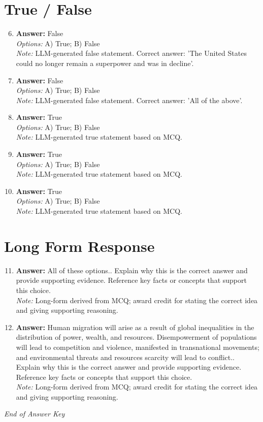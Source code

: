 \documentclass[12pt]{article}
\begin{document}
\section*{True / False}
\begin{enumerate}[label=\arabic*.]
\setcounter{enumi}{5}
\item \textbf{Answer:} False
\\ \textit{Options:} A) True; B) False
\\ \textit{Note:} LLM-generated false statement. Correct answer: 'The United States could no longer remain a superpower and was in decline'.
\item \textbf{Answer:} False
\\ \textit{Options:} A) True; B) False
\\ \textit{Note:} LLM-generated false statement. Correct answer: 'All of the above'.
\item \textbf{Answer:} True
\\ \textit{Options:} A) True; B) False
\\ \textit{Note:} LLM-generated true statement based on MCQ.
\item \textbf{Answer:} True
\\ \textit{Options:} A) True; B) False
\\ \textit{Note:} LLM-generated true statement based on MCQ.
\item \textbf{Answer:} True
\\ \textit{Options:} A) True; B) False
\\ \textit{Note:} LLM-generated true statement based on MCQ.
\end{enumerate}

\section*{Long Form Response}
\begin{enumerate}[label=\arabic*.]
\setcounter{enumi}{10}
\item \textbf{Answer:} All of these options.. Explain why this is the correct answer and provide supporting evidence. Reference key facts or concepts that support this choice.
\\ \textit{Note:} Long-form derived from MCQ; award credit for stating the correct idea and giving supporting reasoning.
\item \textbf{Answer:} Human migration will arise as a result of global inequalities in the distribution of power, wealth, and resources. Disempowerment of populations will lead to competition and violence, manifested in transnational movements; and environmental threats and resources scarcity will lead to conflict.. Explain why this is the correct answer and provide supporting evidence. Reference key facts or concepts that support this choice.
\\ \textit{Note:} Long-form derived from MCQ; award credit for stating the correct idea and giving supporting reasoning.
\end{enumerate}

\vfill
\noindent\textit{End of Answer Key}
\end{document}

